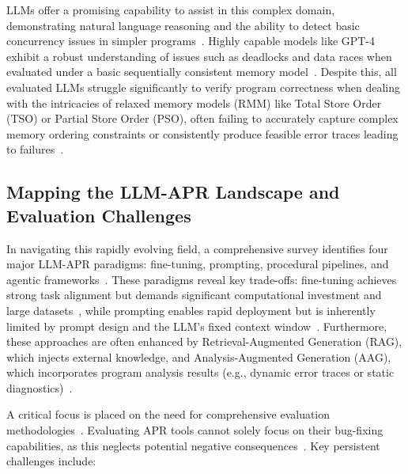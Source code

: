 LLMs offer a promising capability to assist in this complex domain, demonstrating natural language reasoning and the ability to detect basic concurrency issues in simpler programs~\cite{jain2025}. Highly capable models like GPT-4 exhibit a robust understanding of issues such as deadlocks and data races when evaluated under a basic sequentially consistent memory model~\cite{jain2025}. Despite this, all evaluated LLMs struggle significantly to verify program correctness when dealing with the intricacies of relaxed memory models (RMM) like Total Store Order (TSO) or Partial Store Order (PSO), often failing to accurately capture complex memory ordering constraints or consistently produce feasible error traces leading to failures~\cite{jain2025}.

\subsection{Mapping the LLM-APR Landscape and Evaluation Challenges}

In navigating this rapidly evolving field, a comprehensive survey identifies four major LLM-APR paradigms: fine-tuning, prompting, procedural pipelines, and agentic frameworks~\cite{yang2025}. These paradigms reveal key trade-offs: fine-tuning achieves strong task alignment but demands significant computational investment and large datasets~\cite{yang2025}, while prompting enables rapid deployment but is inherently limited by prompt design and the LLM's fixed context window~\cite{yang2025}. Furthermore, these approaches are often enhanced by Retrieval-Augmented Generation (RAG), which injects external knowledge, and Analysis-Augmented Generation (AAG), which incorporates program analysis results (e.g., dynamic error traces or static diagnostics)~\cite{yang2025}.

A critical focus is placed on the need for comprehensive evaluation methodologies~\cite{liyanage2025}. Evaluating APR tools cannot solely focus on their bug-fixing capabilities, as this neglects potential negative consequences~\cite{liyanage2025}. Key persistent challenges include:

